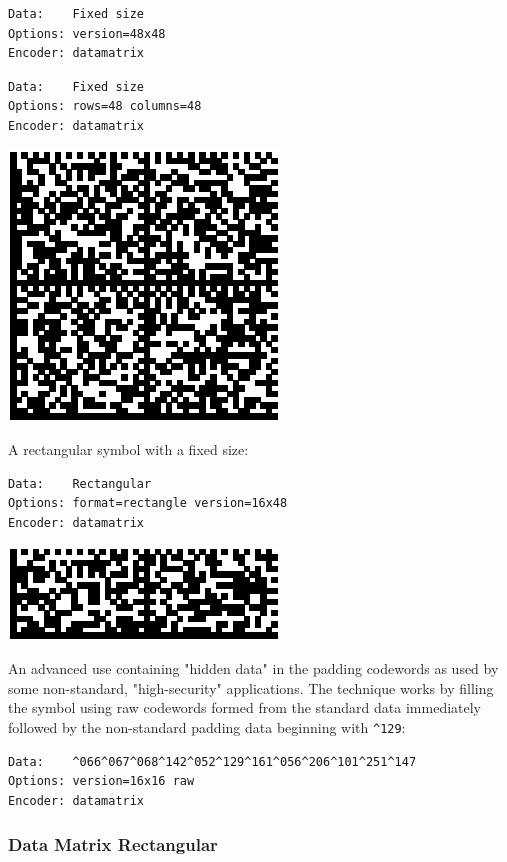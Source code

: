 \begin{verbatim}
Data:    Fixed size
Options: version=48x48
Encoder: datamatrix
\end{verbatim}

\begin{verbatim}
Data:    Fixed size
Options: rows=48 columns=48
Encoder: datamatrix
\end{verbatim}

\includegraphics{images/datamatrix-2.eps}

A rectangular symbol with a fixed size:

\begin{verbatim}
Data:    Rectangular
Options: format=rectangle version=16x48
Encoder: datamatrix
\end{verbatim}

\includegraphics{images/datamatrix-3.eps}

An advanced use containing "hidden data" in the padding codewords as
used by some non-standard, "high-security" applications. The technique
works by filling the symbol using raw codewords formed from the standard
data immediately followed by the non-standard padding data beginning
with \texttt{\^{}129}:

\begin{verbatim}
Data:    ^066^067^068^142^052^129^161^056^206^101^251^147
Options: version=16x16 raw
Encoder: datamatrix
\end{verbatim}

\hypertarget{data-matrix-rectangular}{%
\subsubsection{Data Matrix Rectangular}\label{data-matrix-rectangular}}

